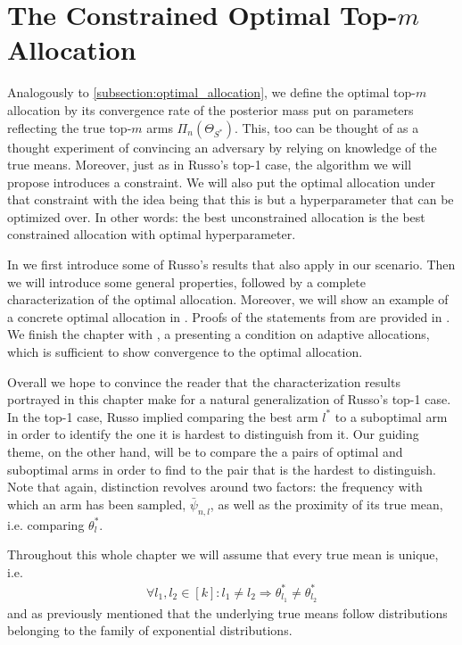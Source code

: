 \chapter{The Constrained Optimal Top-$m$ Allocation}\label{chapter:optimal}
Analogously to \ref{subsection:optimal_allocation}, we define the optimal
top-$m$ allocation by its convergence rate of the posterior mass put on
parameters reflecting the true top-$m$ arms $\Pi_n(\Theta_{S^*})$. This, too can
be thought of as a thought experiment of convincing an adversary by relying on
knowledge of the true means.  Moreover, just as in Russo's top-1 case, the
algorithm we will propose introduces a constraint. We will also put the optimal
allocation under that constraint with the idea being that this is but a
hyperparameter that can be optimized over. In other words: the best
unconstrained allocation is the best constrained allocation with optimal
hyperparameter.

In  we first introduce some of Russo's results
that also apply in our scenario. Then we will introduce some general properties,
followed by a complete characterization of the optimal allocation. Moreover, we
will show an example of a concrete optimal allocation in
. Proofs of the statements from
 are provided in .
We finish the chapter with , a
presenting a condition on adaptive allocations, which is sufficient to show
convergence to the optimal allocation.

Overall we hope to convince the reader that the characterization results
portrayed in this chapter make for a natural generalization of Russo's top-1
case. In the top-1 case, Russo implied comparing the best arm $l^*$ to a
suboptimal arm in order to identify the one it is hardest to distinguish from
it. Our guiding theme, on the other hand, will be to compare the a pairs of
optimal and suboptimal arms in order to find to the pair that is the hardest to
distinguish. Note that again, distinction revolves around two factors: the
frequency with which an arm has been sampled, $\bar{\psi}_{n, l}$, as well as
the proximity of its true mean, i.e. comparing $\theta^*_l$.

Throughout this whole chapter we will assume that every true mean is unique,
i.e.
\begin{align}
  \forall l_1, l_2 \in [k]: l_1 \neq l_2 \Rightarrow \theta^*_{l_1} \neq
      \theta^*_{l_2}
\end{align}
and as previously mentioned that the underlying true means follow distributions
belonging to the family of exponential distributions.

